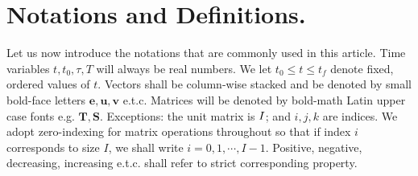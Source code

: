 \section{Notations and Definitions.}
\label{sec:notations}

Let us now introduce the notations that are commonly used in this article. 
Time variables \eg $t, t_0, \tau, T$ will always be  real numbers. We let $t_0 \le t \le t_f$ denote fixed, ordered values of $t$. Vectors shall be column-wise stacked and be denoted by small bold-face letters \ie $\mathbf{e}, \mathbf{u}, \mathbf{v}$  e.t.c. %
Matrices  will  be denoted by bold-math Latin  upper case  fonts  e.g. $\mathbf{T}, \mathbf{S}$.  %
Exceptions: the unit matrix is $I$; and $i,j,k$ are indices.  We adopt zero-indexing for matrix operations throughout so that if index $i$ corresponds to size $I$, we shall write $i = 0, 1, \cdots , I-1$. %
Positive, negative, decreasing, increasing e.t.c. shall refer to strict corresponding property.
%
%
%
%
%
